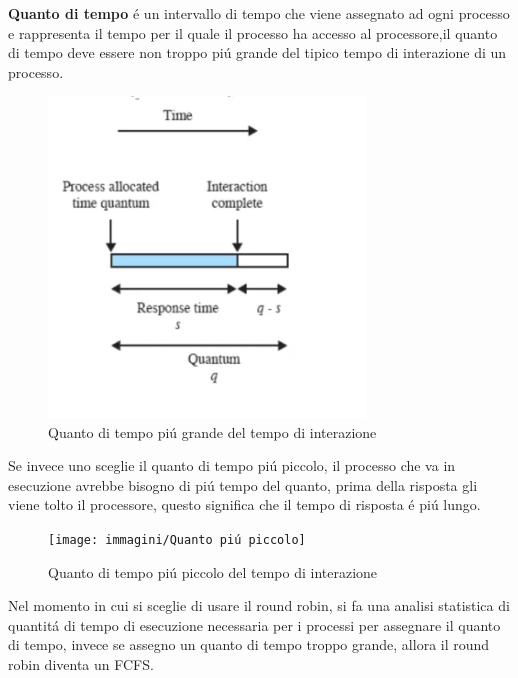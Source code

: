     \textbf{Quanto di tempo} é un intervallo di tempo che viene assegnato ad ogni processo e rappresenta il tempo per il quale il processo ha accesso
    al processore,il quanto di tempo deve essere non troppo piú grande del tipico tempo di interazione di un processo.
    \begin{figure}[H]
        \centering
        \includegraphics[width=0.75\textwidth]{immagini/Quanto di tempo Giusto}
        \caption{Quanto di tempo piú grande del tempo di interazione}
    \end{figure}
    Se invece uno sceglie il quanto di tempo piú piccolo, il processo che va in esecuzione avrebbe bisogno di piú tempo del quanto,
    prima della risposta gli viene tolto il processore, questo significa che il tempo di risposta é piú lungo.
    \begin{figure}[H]
        \centering
        \texttt{[image: immagini/Quanto piú piccolo]}
        \caption{Quanto di tempo piú piccolo del tempo di interazione}
    \end{figure}
    Nel momento in cui si sceglie di usare il round robin, si fa una analisi statistica di quantitá di tempo di esecuzione
    necessaria per i processi per assegnare il quanto di tempo, invece se assegno un quanto di tempo troppo grande, allora
    il round robin diventa un FCFS.
